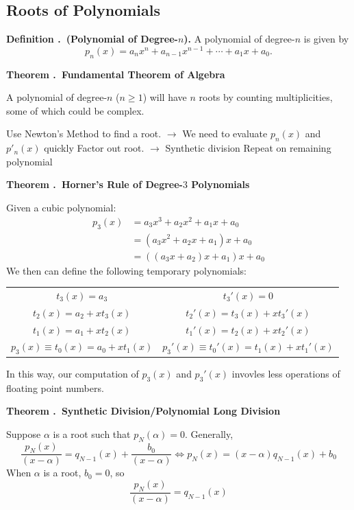\documentclass[12pt, a4paper]{article}
\newcounter{index}[subsection]
\newenvironment*{df}[1]{\par\noindent\textbf{Definition \thesubsection.\stepcounter{index}\theindex\ (#1).}}{\par}
\newenvironment*{thm}[1]{\begin{tcolorbox}\par\noindent\textbf{Theorem \thesubsection.\stepcounter{index}\theindex\ #1} \par}{\par\end{tcolorbox}}
\begin{document}
\subsection{Roots of Polynomials}
\begin{df}{Polynomial of Degree-$n$}
	A polynomial of degree-$n$ is given by \[p_n(x)=a_nx^n+a_{n-1}x^{n-1}+\cdots+a_1x+a_0.\]	
\end{df}
\begin{thm}{Fundamental Theorem of Algebra}
	A polynomial of degree-$n$ ($n\geq1$) will have $n$	roots by counting multiplicities, some of which could be complex. 
\end{thm}
\begin{algorithm}
	\caption{Roots of Polynomials}
	Use Newton's Method to find a root. $\longrightarrow$ We need to evaluate $p_n(x)$ and $p'_n(x)$ quickly\;
	Factor out root. $\longrightarrow$ Synthetic division\;
	Repeat on remaining polynomial\;	
\end{algorithm}
\begin{thm}{Horner's Rule of Degree-$3$ Polynomials}
	Given a cubic polynomial: \begin{align*}p_3(x)&=a_3x^3+a_2x^2+a_1x+a_0\\&=(a_3x^2+a_2x+a_1)x+a_0\\&=((a_3x+a_2)x+a_1)x+a_0\end{align*}
	We then can define the following temporary polynomials: 
	\begin{center}\begin{tabular}{c|c}
	$t_3(x)=a_3$&$t_3'(x)=0$\\
	$t_2(x)=a_2+xt_3(x)$&$t_2'(x)=t_3(x)+xt_3'(x)$\\
	$t_1(x)=a_1+xt_2(x)$&$t_1'(x)=t_2(x)+xt_2'(x)$\\
	$p_3(x)\equiv t_0(x)=a_0+xt_1(x)$&$p_3'(x)\equiv t_0'(x)=t_1(x)+xt_1'(x)$
	\end{tabular}\end{center}
	In this way, our computation of $p_3(x)$ and $p_3'(x)$ invovles less operations of floating point numbers. 
\end{thm}
\begin{algorithm}
	\caption{Horner's Rule in Practice}
	\BlankLine{}
\end{algorithm}
\begin{thm}{Synthetic Division/Polynomial Long Division}
	Suppose $\alpha$ is a root such that $p_N(\alpha)=0$. Generally, \[\dfrac{p_N(x)}{(x-\alpha)}=q_{N-1}(x)+\dfrac{b_0}{(x-\alpha)}\iff p_N(x)=(x-\alpha)q_{N-1}(x)+b_0\] When $\alpha$ is a root, $b_0=0$, so \[\dfrac{p_N(x)}{(x-\alpha)}=q_{N-1}(x)\]
\end{thm}
\end{document}
